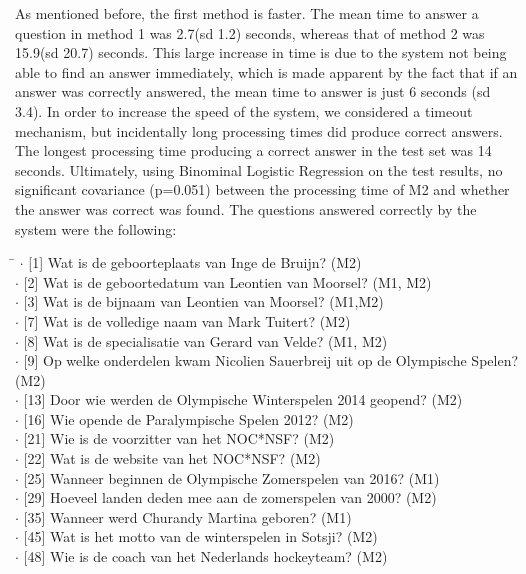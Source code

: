 \documentclass[a4paper,11pt]{article}
\begin{document}
As mentioned before, the first method is faster. The mean time to answer a question in method 1 was 2.7(sd 1.2) seconds, whereas that of method 2 was 15.9(sd 20.7) seconds. This large increase in time is due to the system not being able to find an answer immediately, which is made apparent by the fact that if an answer was correctly answered, the mean time to answer is just 6 seconds (sd 3.4). In order to increase the speed of the system, we considered a timeout mechanism, but incidentally long processing times did produce correct answers. The longest processing time producing a correct answer in the test set was 14 seconds. Ultimately, using Binominal Logistic Regression on the test results, no significant covariance (p=0.051) between the processing time of M2 and whether the answer was correct was found.%
The questions answered correctly by the system were the following:
\begin{tabbing}
\hspace{4mm}\= $\cdot$ [1] Wat is de geboorteplaats van Inge de Bruijn? (M2)\\
\> $\cdot$ [2] Wat is de geboortedatum van Leontien van Moorsel? (M1, M2)\\
\> $\cdot$ [3] Wat is de bijnaam van Leontien van Moorsel? (M1,M2)\\
\> $\cdot$ [7] Wat is de volledige naam van Mark Tuitert? (M2)\\
\> $\cdot$ [8] Wat is de specialisatie van Gerard van Velde? (M1, M2)\\
\> $\cdot$ [9] Op welke onderdelen kwam Nicolien Sauerbreij uit op de Olympische Spelen? (M2)\\
\> $\cdot$ [13] Door wie werden de Olympische Winterspelen 2014 geopend? (M2)\\
\> $\cdot$ [16] Wie opende de Paralympische Spelen 2012? (M2)\\
\> $\cdot$ [21] Wie is de voorzitter van het NOC*NSF? (M2)\\
\> $\cdot$ [22] Wat is de website van het NOC*NSF? (M2)\\
\> $\cdot$ [25] Wanneer beginnen de Olympische Zomerspelen van 2016? (M1)\\
\> $\cdot$ [29] Hoeveel landen deden mee aan de zomerspelen van 2000? (M2)\\
\> $\cdot$ [35] Wanneer werd Churandy Martina geboren? (M1)\\
\> $\cdot$ [45] Wat is het motto van de winterspelen in Sotsji? (M2)\\
\> $\cdot$ [48] Wie is de coach van het Nederlands hockeyteam? (M2)
\end{tabbing}
\end{document}
